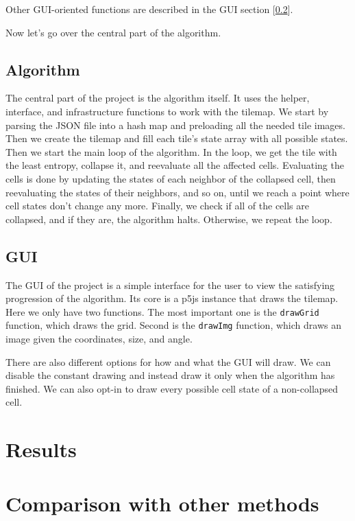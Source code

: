 \documentclass[10pt,twoside,a4paper]{article}
\begin{document}
Other GUI-oriented functions are described in the GUI section [\ref*{sec:gui}].

Now let's go over the central part of the algorithm.


\subsection{Algorithm}\label{sec:algorithm}
The central part of the project is the algorithm itself.
It uses the helper, interface, and infrastructure functions to work with the tilemap.
We start by parsing the JSON file into a hash map and preloading all the needed tile images.
Then we create the tilemap and fill each tile's state array with all possible states.
Then we start the main loop of the algorithm.
In the loop, we get the tile with the least entropy, collapse it, and reevaluate all the affected cells.
Evaluating the cells is done by updating the states of each neighbor of the collapsed cell, then reevaluating the states of their neighbors, and so on, until we reach a point where cell states don't change any more.
Finally, we check if all of the cells are collapsed, and if they are, the algorithm halts.
Otherwise, we repeat the loop.

\subsection{GUI}\label{sec:gui}
The GUI of the project is a simple interface for the user to view the satisfying progression of the algorithm.
Its core is a p5js instance that draws the tilemap.
Here we only have two functions. 
The most important one is the \texttt{drawGrid} function, which draws the grid.
Second is the \texttt{drawImg} function, which draws an image given the coordinates, size, and angle.

There are also different options for how and what the GUI will draw.
We can disable the constant drawing and instead draw it only when the algorithm has finished.
We can also opt-in to draw every possible cell state of a non-collapsed cell.


\section{Results}\label{sec:results}
\section{Comparison with other methods}\label{sec:comparison}
\end{document}
